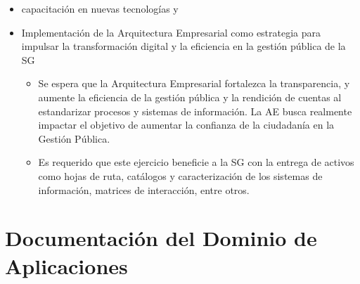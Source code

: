\documentclass[
	a4paper, %
	12pt, %
]{include/CSSullivanBusinessReport}
\def\tightlist{}
\begin{document}
\begin{itemize}
  \begin{itemize}
  \tightlist
  \item
    Se busca la consolidación de herramientas, canales e información
    para fortalecer la oferta y celeridad de servicios y la
    participación ciudadana. Esto incluye el seguimiento a canales de
    atención virtual como SuperCADE Virtual, chat, chat-Bot y (video)
    llamadas de la línea 195.
  \item
    Se busca optimizar los procesos de recolección, análisis y
    divulgación de la información mediante la implementación de sistemas
    de información que incluyan la automatización de la recolección de
    datos y el uso de herramientas analíticas.
  \item
    Es destacado que el Distrito unifica en el portal Bogotá su oferta
    de trámites y servicios, como el realizar pagos en línea (no
    tributarios) y agendamiento de citas en la RedCADE desde casa;
    esfuerzo que debe continuar y extenderse a los más de 1.400 trámites
    y servicios. Esto representa una mejora significativa en la
    accesibilidad y eficiencia de los servicios digitales para la
    ciudadanía.
  \end{itemize}
\item
  capacitación en nuevas tecnologías y
\item
  Implementación de la Arquitectura Empresarial como estrategia para
  impulsar la transformación digital y la eficiencia en la gestión
  pública de la SG

  \begin{itemize}
  \tightlist
  \item
    Se espera que la Arquitectura Empresarial fortalezca la
    transparencia, y aumente la eficiencia de la gestión pública y la
    rendición de cuentas al estandarizar procesos y sistemas de
    información. La AE busca realmente impactar el objetivo de aumentar
    la confianza de la ciudadanía en la Gestión Pública.
  \item
    Es requerido que este ejercicio beneficie a la SG con la entrega de
    activos como hojas de ruta, catálogos y caracterización de los
    sistemas de información, matrices de interacción, entre otros.
  \end{itemize}
\end{itemize}

\newpage

\section{Documentación del Dominio de
Aplicaciones}\label{sec:documentaciuxf3n-del-dominio-de-aplicaciones}
\end{document}
